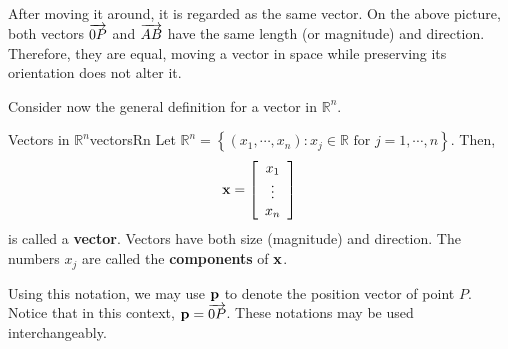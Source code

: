 \begin{center}
\end{center}

After moving it around, it is regarded as the same vector. On the above picture, both vectors $\overrightarrow{0P}$ and $\overrightarrow{AB}$ have the same length (or magnitude) and direction. Therefore, they are equal, moving a vector in space while preserving its orientation does not alter it.

Consider now the general definition for a vector in $\mathbb{R}^n$. 

\begin{definition}{Vectors in $\mathbb{R}^n$}{vectorsRn}
Let $\mathbb{R}^{n} = \left\{ \left( x_{1}, \cdots, x_{n}\right)
:x_{j}\in \mathbb{R}\text{ for }j=1,\cdots ,n\right\} .$
Then,
\begin{equation*}
{\bf x}
=
\left[ \begin{array}{c}
x_{1} \\
\vdots \\
x_{n}
\end{array}
\right] 
\end{equation*}
is called a \textbf{vector}. Vectors have both size (magnitude) and direction. 
The numbers $x_{j}$ are called the \textbf{components}  of ${\bf x}$. 
\end{definition}

Using this notation, we may use ${\bf p}$ to denote the position vector of point $P$. Notice that in this context, ${\bf p} = \overrightarrow{0P}$. These notations may be used interchangeably. 

